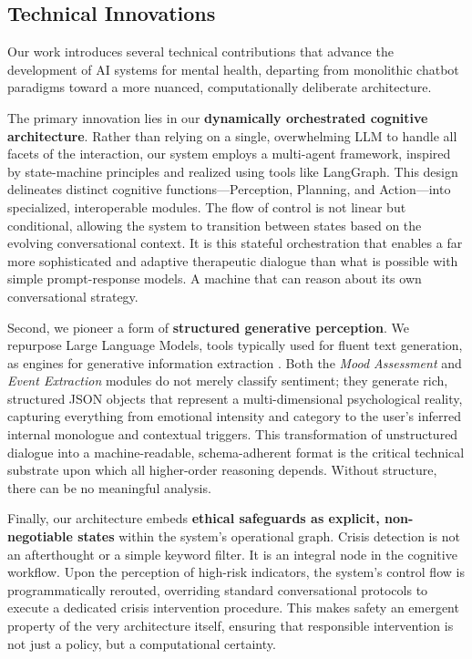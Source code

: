 \subsection{Technical Innovations}

Our work introduces several technical contributions that advance the development of AI systems for mental health, departing from monolithic chatbot paradigms toward a more nuanced, computationally deliberate architecture.

The primary innovation lies in our \textbf{dynamically orchestrated cognitive architecture}. Rather than relying on a single, overwhelming LLM to handle all facets of the interaction, our system employs a multi-agent framework, inspired by state-machine principles and realized using tools like LangGraph. This design delineates distinct cognitive functions—Perception, Planning, and Action—into specialized, interoperable modules. The flow of control is not linear but conditional, allowing the system to transition between states based on the evolving conversational context. It is this stateful orchestration that enables a far more sophisticated and adaptive therapeutic dialogue than what is possible with simple prompt-response models. A machine that can reason about its own conversational strategy.

Second, we pioneer a form of \textbf{structured generative perception}. We repurpose Large Language Models, tools typically used for fluent text generation, as engines for generative information extraction \cite{xu2023large}. Both the \textit{Mood Assessment} and \textit{Event Extraction} modules do not merely classify sentiment; they generate rich, structured JSON objects that represent a multi-dimensional psychological reality, capturing everything from emotional intensity and category to the user's inferred internal monologue and contextual triggers. This transformation of unstructured dialogue into a machine-readable, schema-adherent format is the critical technical substrate upon which all higher-order reasoning depends. Without structure, there can be no meaningful analysis.

Finally, our architecture embeds \textbf{ethical safeguards as explicit, non-negotiable states} within the system's operational graph. Crisis detection is not an afterthought or a simple keyword filter. It is an integral node in the cognitive workflow. Upon the perception of high-risk indicators, the system's control flow is programmatically rerouted, overriding standard conversational protocols to execute a dedicated crisis intervention procedure. This makes safety an emergent property of the very architecture itself, ensuring that responsible intervention is not just a policy, but a computational certainty.

